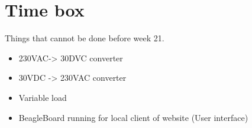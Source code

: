 \section{Time box}
Things that cannot be done before week 21.
\begin{itemize}
	\item 230VAC-> 30DVC converter
	\item 30VDC -> 230VAC converter
	\item Variable load
	\item BeagleBoard running for local client of website (User interface)
\end{itemize}